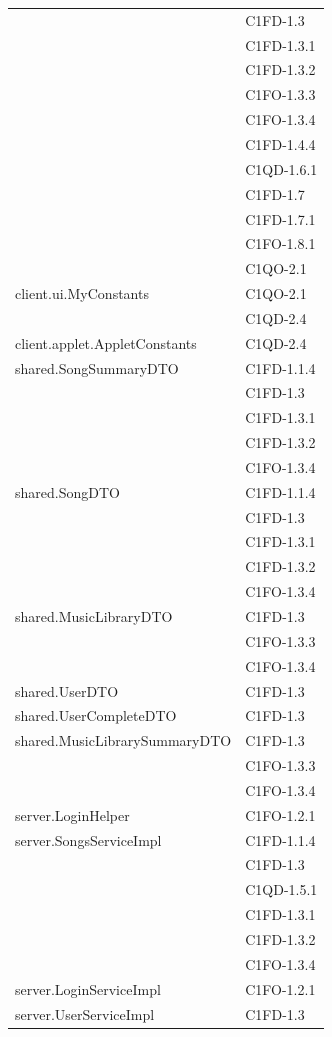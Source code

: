 \begin{footnotesize}
\begin{longtable}[!h]{|l|l|}
& C1FD-1.3\\
& C1FD-1.3.1\\ 
& C1FD-1.3.2\\
& C1FO-1.3.3\\
& C1FO-1.3.4\\
& C1FD-1.4.4\\
& C1QD-1.6.1\\
& C1FD-1.7\\
& C1FD-1.7.1\\
& C1FO-1.8.1\\
& C1QO-2.1\\\hline 
client.ui.MyConstants  &  C1QO-2.1 \\
& C1QD-2.4 \\\hline  
client.applet.AppletConstants  &  C1QD-2.4\\\hline 
shared.SongSummaryDTO  &  C1FD-1.1.4\\
& C1FD-1.3\\
& C1FD-1.3.1\\
& C1FD-1.3.2\\
& C1FO-1.3.4\\\hline
shared.SongDTO  &  C1FD-1.1.4\\
& C1FD-1.3\\
& C1FD-1.3.1\\
& C1FD-1.3.2\\
& C1FO-1.3.4\\\hline 
shared.MusicLibraryDTO  &  C1FD-1.3\\
& C1FO-1.3.3\\
& C1FO-1.3.4\\\hline 
shared.UserDTO  &  C1FD-1.3 \\\hline  
shared.UserCompleteDTO  &  C1FD-1.3 \\\hline 
shared.MusicLibrarySummaryDTO  &  C1FD-1.3\\
& C1FO-1.3.3\\
& C1FO-1.3.4\\\hline  
server.LoginHelper  &  C1FO-1.2.1 \\\hline 
server.SongsServiceImpl  &  C1FD-1.1.4\\
& C1FD-1.3\\
& C1QD-1.5.1\\
& C1FD-1.3.1\\
& C1FD-1.3.2\\
& C1FO-1.3.4\\\hline 
server.LoginServiceImpl  &  C1FO-1.2.1\\\hline 
server.UserServiceImpl  &  C1FD-1.3 \\

\end{longtable}
\end{footnotesize}
